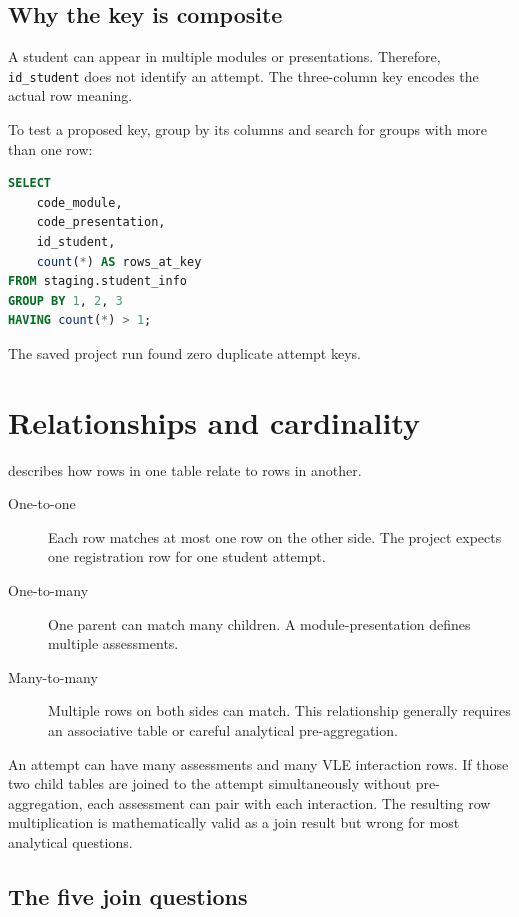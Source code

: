 \subsection{Why the key is composite}

A student can appear in multiple modules or presentations.
Therefore, \texttt{id\_student} does not identify an attempt. The three-column
key encodes the actual row meaning.

\begin{validationbox}
To test a proposed key, group by its columns and search for groups with more
than one row:
\begin{lstlisting}[language=SQL]
SELECT
    code_module,
    code_presentation,
    id_student,
    count(*) AS rows_at_key
FROM staging.student_info
GROUP BY 1, 2, 3
HAVING count(*) > 1;
\end{lstlisting}
The saved project run found zero duplicate attempt keys.
\end{validationbox}

\section{Relationships and cardinality}

 describes how rows in one table relate to rows in another.

\begin{description}
  \item[One-to-one] Each row matches at most one row on the other side. The
    project expects one registration row for one student attempt.
  \item[One-to-many] One parent can match many children. A module-presentation
    defines multiple assessments.
  \item[Many-to-many] Multiple rows on both sides can match. This relationship
    generally requires an associative table or careful analytical
    pre-aggregation.
\end{description}

An attempt can have many assessments and many VLE interaction rows. If those
two child tables are joined to the attempt simultaneously without
pre-aggregation, each assessment can pair with each interaction. The resulting
row multiplication is mathematically valid as a join result but wrong for most
analytical questions.

\subsection{The five join questions}

